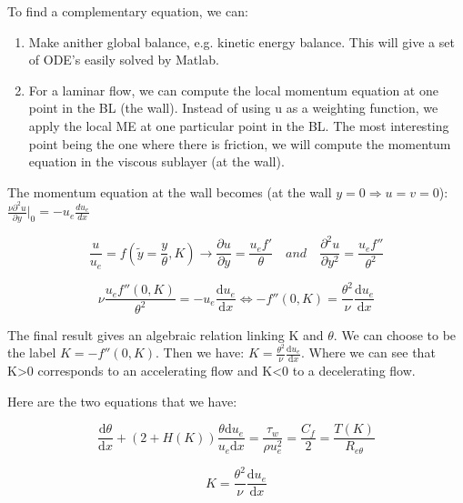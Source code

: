 To find a complementary equation, we can:
\begin{enumerate}
\item Make anither global balance, e.g. kinetic energy balance. This will give a set of ODE's easily solved by Matlab.
\item For a laminar flow, we can compute the local momentum equation at one point in the BL (the wall). Instead of using u as a weighting function, we apply the local ME at one particular point in the BL. The most interesting point being the one where there is friction, we will compute the momentum equation in the viscous sublayer (at the wall).
\end{enumerate}

The momentum equation at the wall becomes (at the wall $y=0 \Rightarrow u=v=0$): $ \frac{\nu  \partial^2 u}{\partial y}|_0=-u_e\frac{du_e}{dx}$

\begin{equation}
\newcommand{\deriv}{\mathrm{d}}
\frac{u}{u_e}=f(\tilde{y}=\frac{y}{\theta},K) \rightarrow  \frac{ \partial u}{\partial y}=\frac{u_e f'}{\theta} \quad and \quad \frac{ \partial^2 u}{\partial y^2}=\frac{u_e f''}{\theta^2} 
\end{equation}

\begin{equation}
\newcommand{\deriv}{\mathrm{d}}
\nu \frac{u_e f''(0,K)}{\theta^2}=-u_e \frac{\deriv u_e}{\deriv x} \Leftrightarrow -f''(0,K)=\frac{\theta^2}{\nu} \frac{\deriv u_e}{\deriv x}
\end{equation}

The final result gives an algebraic relation linking K and $\theta$. We can choose to be the label $K=-f''(0,K) $. Then we have: $\newcommand{\deriv}{\mathrm{d}} K=\frac{\theta^2}{\nu} \frac{\deriv u_e}{\deriv x}$. Where we can see that K>0 corresponds to an accelerating flow and K<0 to a decelerating flow.

Here are the two equations that we have:

\begin{equation}
\newcommand{\deriv}{\mathrm{d}}
\frac{\deriv \theta}{\deriv x}+(2+H(K))\frac{\theta \deriv u_e}{u_e \deriv x}=\frac{\tau_w}{\rho u_e^2}=\frac{C_f}{2}=\frac{T(K)}{R_{e \theta}}
\end{equation}

\begin{equation}
\newcommand{\deriv}{\mathrm{d}} 
K=\frac{\theta^2}{\nu} \frac{\deriv u_e}{\deriv x}
\end{equation}

